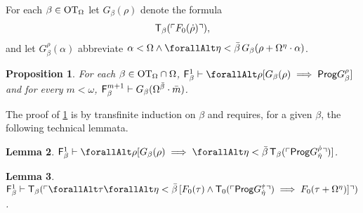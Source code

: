 \documentclass[UKenglish,cleveref,DIV=12]{scrartcl}
\let\forall\forallAlt
\newtheorem{lemma}{Lemma}
\newtheorem{proposition}[lemma]{Proposition}
\theoremstyle{definition}
\theoremstyle{definition}
\begin{document}
For each $\beta\in\mathrm{OT}_\Omega$ let $G_\beta(\rho)$ denote the formula
\begin{align*}
  \mathsf{T}_{\beta}(\ulcorner{F_0(\dot\rho)}\urcorner),
\end{align*}
and let $G_\beta^\rho(\alpha)$ abbreviate $\alpha<\Omega\land \forall\eta<\bar\beta\,G_\beta(\rho+\Omega^\eta\cdot\alpha)$.
\begin{proposition}\label{extlem:Fbetawellordering1}
 For each $\beta\in\mathrm{OT}_\Omega\cap\Omega$, $\F_{\beta}^1\proves \forall\rho[G_\beta(\rho)\implies \Prog G_\beta^\rho]$ and for every $m<\omega$, $\mathsf{F}_{\beta}^{m+1}\vdash G_\beta(\Omega^{\bar\beta}\cdot\bar m)$.
\end{proposition}
The proof of \cref{extlem:Fbetawellordering1} is by transfinite induction on
$\beta$ and requires, for a given $\beta$, the following technical lemmata.
\begin{lemma}\label{extlem:Fbetatech1}
 $\F_\beta^1\proves \forall\rho[G_\beta(\rho)\implies \forall\eta<\bar\beta\,\T_\beta(\gn{\Prog G_{\dot\eta}^{\dot\rho}})]$.
\end{lemma}
\begin{lemma}\label{extlem:Fbetatech2}
  $\F_\beta^1\proves \T_\beta(\gn{\forall\tau\forall\eta<\bar\beta\,[F_0(\tau)\land\T_0(\gn{\Prog G_{\dot\eta}^{\dot\tau}}) \implies
  F_0(\tau+\Omega^{\eta})]})$.
\end{lemma}
\end{document}

